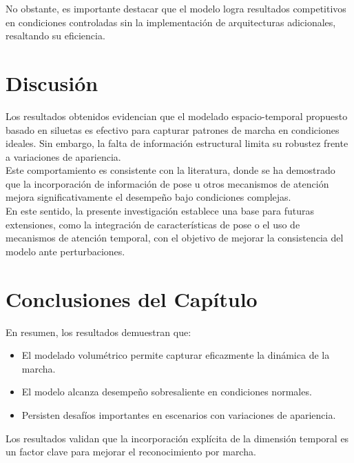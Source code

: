 No obstante, es importante destacar que el modelo logra resultados competitivos en condiciones controladas sin la implementación de arquitecturas adicionales, resaltando su eficiencia.

\section{Discusión}

Los resultados obtenidos evidencian que el modelado espacio-temporal propuesto basado en siluetas es efectivo para capturar patrones de marcha en condiciones ideales. Sin embargo, la falta de información estructural limita su robustez frente a variaciones de apariencia. \\
Este comportamiento es consistente con la literatura, donde se ha demostrado que la incorporación de información de pose u otros mecanismos de atención mejora significativamente el desempeño bajo condiciones complejas. \\
En este sentido, la presente investigación establece una base para futuras extensiones, como la integración de características de pose o el uso de mecanismos de atención temporal, con el objetivo de mejorar la consistencia del modelo ante perturbaciones.

\section{Conclusiones del Capítulo}

En resumen, los resultados demuestran que:

\begin{itemize}
    \item El modelado volumétrico permite capturar eficazmente la dinámica de la marcha.
    \item El modelo alcanza desempeño sobresaliente en condiciones normales.
    \item Persisten desafíos importantes en escenarios con variaciones de apariencia.
\end{itemize}

Los resultados validan que la incorporación explícita de la dimensión temporal es un factor clave para mejorar el reconocimiento por marcha.